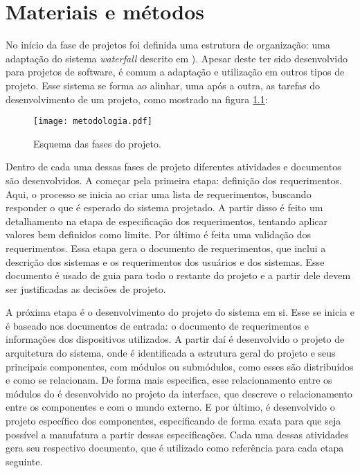 \chapter{Materiais e métodos}
\label{cap:exemplos}

\graphicspath{{\currfiledir/figuras/}}


No início da fase de projetos foi definida uma estrutura de organização: uma adaptação do sistema \textit{waterfall} descrito em \cite{Ian19}). Apesar deste ter sido desenvolvido para projetos de software, é comum a adaptação e utilização em outros tipos de projeto. Esse sistema se forma ao alinhar, uma após a outra, as tarefas do desenvolvimento de um projeto, como mostrado na figura \ref{fig:metodologia}:

\begin{figure}[!htb]
    \centering
    \texttt{[image: metodologia.pdf]}
    \caption{Esquema das fases do projeto.}
    \label{fig:metodologia}
\end{figure}

Dentro de cada uma dessas fases de projeto diferentes atividades e documentos são desenvolvidos. A começar pela primeira etapa: definição dos requerimentos. Aqui, o processo se inicia ao criar uma lista de requerimentos, buscando responder o que é esperado do sistema projetado. A partir disso é feito um detalhamento na etapa de especificação dos requerimentos, tentando aplicar valores bem definidos como limite. Por último é feita uma validação dos requerimentos. Essa etapa gera o documento de requerimentos, que inclui a descrição dos sistemas e os requerimentos dos usuários e dos sistemas. Esse documento é usado de guia para todo o restante do projeto e a partir dele devem ser justificadas as decisões de projeto.

A próxima etapa é o desenvolvimento do projeto do sistema em si. Esse se inicia e é baseado nos documentos de entrada: o documento de requerimentos e informações dos dispositivos utilizados. A partir daí é desenvolvido o projeto de arquitetura do sistema, onde é identificada a estrutura geral do projeto e seus principais componentes, com módulos ou submódulos, como esses são distribuídos e como se relacionam. De forma mais especifica, esse relacionamento entre os módulos do é desenvolvido no projeto da interface, que descreve o relacionamento entre os componentes e com o mundo externo. E por último, é desenvolvido o projeto específico dos componentes, especificando de forma exata para que seja possível a manufatura a partir dessas especificações. Cada uma dessas atividades gera seu respectivo documento, que é utilizado como referência para cada etapa seguinte.

